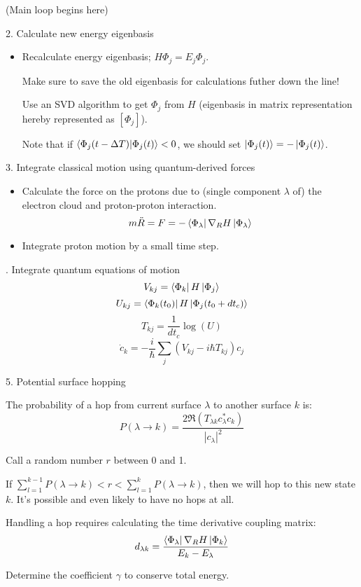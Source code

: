 \documentclass[12pt]{article}
\newcommand{\eigbasis}[0]{[\Phi_j]}
\begin{document}
(Main loop begins here)

2. Calculate new energy eigenbasis
\begin{itemize}
    \item Recalculate energy eigenbasis; $H\Phi_j = E_j\Phi_j$.

        Make sure to save the old eigenbasis for calculations futher down the line!

        Use an SVD algorithm to get $\Phi_j$ from $H$ (eigenbasis in matrix representation hereby represented as $\eigbasis$).

        Note that if $\bra{\Phi_j(t - \Delta T)}\ket{\Phi_j(t)} < 0$, we should set $\ket{\Phi_j(t)} = -\ket{\Phi_j(t)}$.
\end{itemize}

3. Integrate classical motion using quantum-derived forces
\begin{itemize}
    \item Calculate the force on the protons due to (single component $\lambda$ of) the electron cloud and proton-proton interaction.
        \[ m\ddot{R} = F = -\bra{\Phi_\lambda}\nabla_R H\ket{\Phi_\lambda} \]

    \item Integrate proton motion by a small time step.
\end{itemize}

. Integrate quantum equations of motion
\[ V_{kj} = \bra{\Phi_k}H\ket{\Phi_j} \]
\[ U_{kj} = \bra{\Phi_k(t_0)}H\ket{\Phi_j(t_0 + dt_c)} \]
\[ T_{kj} = \frac{1}{dt_c}\log(U) \]
\[ \dot{c}_k = -\frac{i}{\hbar} \sum_j (V_{kj} - i\hbar T_{kj})c_j \]

5. Potential surface hopping

The probability of a hop from current surface $\lambda$ to another surface $k$ is:
\[ P(\lambda\to k) = \frac{2\Re(T_{\lambda k} c_\lambda^* c_k)}{|c_\lambda|^2} \]

Call a random number $r$ between 0 and 1. 

If $\sum_{l=1}^{k-1} P(\lambda\to k) < r < \sum_{l=1}^k P(\lambda\to k)$, then we will hop to this new state $k$. It's possible and even likely to have no hops at all.

Handling a hop requires calculating the time derivative coupling matrix:
\[ d_{\lambda k} = \frac{\bra{\Phi_\lambda}\nabla_R H\ket{\Phi_k}}{E_k - E_\lambda} \]

Determine the coefficient $\gamma$ to conserve total energy.
\end{document}
